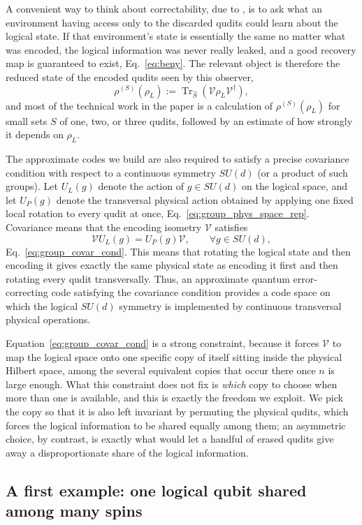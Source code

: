 \documentclass[10pt,twocolumn,superscriptaddress,aps,amsmath,amssymb,citeautoscript,floatfix,prx]{revtex4-2}
\theoremstyle{plain}
\theoremstyle{plain}
\theoremstyle{plain}
\theoremstyle{plain}
\theoremstyle{plain}
\theoremstyle{plain}
\theoremstyle{plain}
\theoremstyle{definition}
\theoremstyle{plain}
\begin{document}
A convenient way to think about correctability, due to \citet{Beny2010}, is to ask what an environment having access only to the discarded qudits could learn about the logical state. If that environment's state is essentially the same no matter what was encoded, the logical information was never really leaked, and a good recovery map is guaranteed to exist, Eq.~\eqref{eq:beny}. 
The relevant object is therefore the reduced state of the encoded qudits seen by this observer,
$$
\rho^{(S)}(\rho_L):=\operatorname{Tr}_{\hat S}\!\left(\mathcal{V}\rho_L\mathcal{V}^\dagger\right),
$$
and most of the technical work in the paper is a calculation of $\rho^{(S)}(\rho_L)$ for small sets $S$ of one, two, or three qudits, followed by an estimate of how strongly it depends on $\rho_L$.
 
The approximate codes we build are also required to satisfy a precise covariance condition with respect to a continuous symmetry $SU(d)$ (or a product of such groups). 
Let $U_L(g)$ denote the action of $g\in SU(d)$ on the logical space, and let $U_P(g)$ denote the transversal physical action obtained by applying one fixed local rotation to every qudit at once, 
Eq.~\eqref{eq:group_phys_space_rep}. Covariance means that the encoding isometry $\mathcal{V}$ satisfies
$$
\mathcal{V}U_L(g)=U_P(g)\mathcal{V},\qquad \forall g\in SU(d),
$$
Eq.~\eqref{eq:group_covar_cond}. This means that rotating the logical state and then encoding it gives exactly the same physical state as encoding it first and then rotating every qudit transversally. 
Thus, an approximate quantum error-correcting code satisfying the covariance condition provides a code space on which the logical $SU(d)$ symmetry is implemented by continuous transversal physical operations.

Equation~\eqref{eq:group_covar_cond} is a strong constraint, because it forces $\mathcal{V}$ to map the logical space onto one specific copy of itself sitting inside the physical Hilbert space, among the several equivalent copies that occur there once $n$ is large enough. 
What this constraint does not fix is \emph{which} copy to choose when more than one is available, and this is exactly the freedom we exploit. We pick the copy so that it is also left invariant by permuting the physical qudits, which forces the logical information to be shared equally among them; an asymmetric choice, 
by contrast, is exactly what would let a handful of erased qudits give away a disproportionate share of the logical information.
 
\subsection{A first example: one logical qubit shared among many spins}\label{subsec:summary_su2}
 
\end{document}
